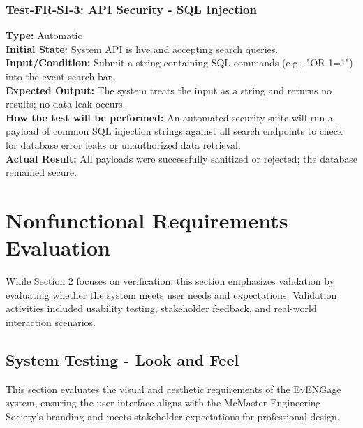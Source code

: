 \documentclass[12pt, titlepage]{article}
\begin{document}
\subsubsection{Test-FR-SI-3: API Security - SQL Injection}
\textbf{Type:} Automatic \\
\textbf{Initial State:} System API is live and accepting search queries. \\
\textbf{Input/Condition:} Submit a string containing SQL commands (e.g., "OR 1=1") into the event search bar. \\
\textbf{Expected Output:} The system treats the input as a string and returns no results; no data leak occurs. \\
\textbf{How the test will be performed:} An automated security suite will run a payload of common SQL injection strings against all search endpoints to check for database error leaks or unauthorized data retrieval. \\
\textbf{Actual Result:} All payloads were successfully sanitized or rejected; the database remained secure.\\

\section{Nonfunctional Requirements Evaluation}

While Section 2 focuses on verification, this section emphasizes validation by evaluating whether the system meets user needs and expectations. Validation activities included usability testing, stakeholder feedback, and real-world interaction scenarios.

\subsection{System Testing - Look and Feel}
This section evaluates the visual and aesthetic requirements of the EvENGage system, ensuring the user interface aligns with the McMaster Engineering Society's branding and meets stakeholder expectations for professional design.
\end{document}
